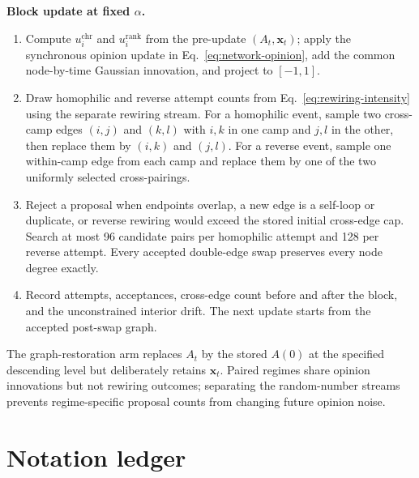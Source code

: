\documentclass[pdflatex,sn-mathphys-num]{sn-jnl}
\newcommand{\inlinehead}[1]{\par\smallskip\noindent\textbf{#1}\ }
\begin{document}
\begin{appendices}
\inlinehead{Block update at fixed $\alpha$.}
\begin{enumerate}
  \item Compute $u_i^{\mathrm{chr}}$ and $u_i^{\mathrm{rank}}$ from the pre-update $(A_t,\bm x_t)$; apply the synchronous opinion update in Eq.~\eqref{eq:network-opinion}, add the common node-by-time Gaussian innovation, and project to $[-1,1]$.
  \item Draw homophilic and reverse attempt counts from Eq.~\eqref{eq:rewiring-intensity} using the separate rewiring stream. For a homophilic event, sample two cross-camp edges $(i,j)$ and $(k,l)$ with $i,k$ in one camp and $j,l$ in the other, then replace them by $(i,k)$ and $(j,l)$. For a reverse event, sample one within-camp edge from each camp and replace them by one of the two uniformly selected cross-pairings.
  \item Reject a proposal when endpoints overlap, a new edge is a self-loop or duplicate, or reverse rewiring would exceed the stored initial cross-edge cap. Search at most 96 candidate pairs per homophilic attempt and 128 per reverse attempt. Every accepted double-edge swap preserves every node degree exactly.
  \item Record attempts, acceptances, cross-edge count before and after the block, and the unconstrained interior drift. The next update starts from the accepted post-swap graph.
\end{enumerate}
The graph-restoration arm replaces $A_t$ by the stored $A(0)$ at the specified descending level but deliberately retains $\bm x_t$. Paired regimes share opinion innovations but not rewiring outcomes; separating the random-number streams prevents regime-specific proposal counts from changing future opinion noise.

\section{Notation ledger}


\end{appendices}
\end{document}
